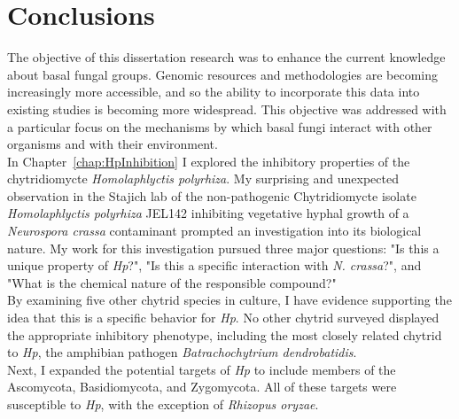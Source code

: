 \chapter{Conclusions}
The objective of this dissertation research was to enhance the current knowledge about basal fungal groups. Genomic resources and methodologies are becoming increasingly more accessible, and so the ability to incorporate this data into existing studies is becoming more widespread. This objective was addressed with a particular focus on the mechanisms by which basal fungi interact with other organisms and with their environment. \\
\indent In Chapter~\ref{chap:HpInhibition} I explored the inhibitory properties of the chytridiomycte \textit{Homolaphlyctis polyrhiza}. My surprising and unexpected observation in the Stajich lab of the non-pathogenic Chytridiomycte isolate \textit{Homolaphlyctis polyrhiza} JEL142 inhibiting vegetative hyphal growth of a \textit{Neurospora crassa} contaminant prompted an investigation into its biological nature. My work for this investigation pursued three major questions: "Is this a unique property of \textit{Hp}?", "Is this a specific interaction with \textit{N. crassa}?", and "What is the chemical nature of the responsible compound?"\\
\indent By examining five other chytrid species in culture, I have evidence supporting the idea that this is a specific behavior for \textit{Hp}. No other chytrid surveyed displayed the appropriate inhibitory phenotype, including the most closely related chytrid to \textit{Hp}, the amphibian pathogen \textit{Batrachochytrium dendrobatidis}.\\
\indent Next, I expanded the potential targets of \textit{Hp} to include members of the Ascomycota, Basidiomycota, and Zygomycota. All of these targets were susceptible to \textit{Hp}, with the exception of \textit{Rhizopus oryzae}.\\
